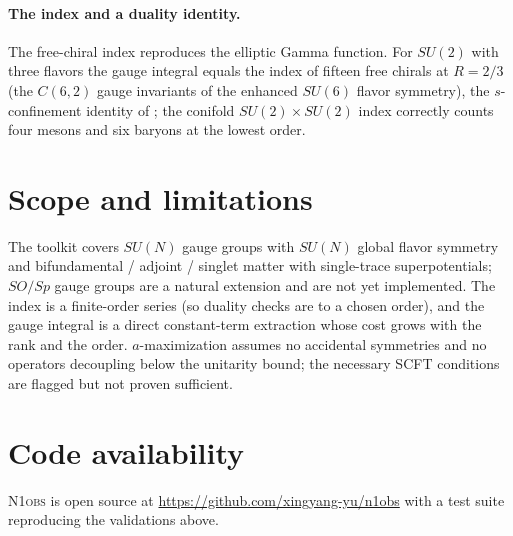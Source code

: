 \documentclass[11.5pt]{scrartcl}
\newcommand{\toolname}{\textsc{N1obs}}
\begin{document}
\paragraph{The index and a duality identity.}
The free-chiral index reproduces the elliptic Gamma function. For $SU(2)$ with
three flavors the gauge integral equals the index of fifteen free chirals at
$R=2/3$ (the $C(6,2)$ gauge invariants of the enhanced $SU(6)$ flavor
symmetry), the $s$-confinement identity of \cite{1608.02965,0910.5944}; the
conifold $SU(2)\times SU(2)$ index correctly counts four mesons and six
baryons at the lowest order.

\section{Scope and limitations}

The toolkit covers $SU(N)$ gauge groups with $SU(N)$ global flavor symmetry and
bifundamental / adjoint / singlet matter with single-trace superpotentials;
$SO/Sp$ gauge groups are a natural extension and are not yet implemented. The
index is a finite-order series (so duality checks are to a chosen order), and
the gauge integral is a direct constant-term extraction whose cost grows with
the rank and the order. $a$-maximization assumes no accidental symmetries and
no operators decoupling below the unitarity bound; the necessary SCFT
conditions are flagged but not proven sufficient.

\section{Code availability}

\toolname{} is open source at \url{https://github.com/xingyang-yu/n1obs}
with a test suite reproducing the validations above.

\printbibliography[heading=bibliography]
\end{document}
